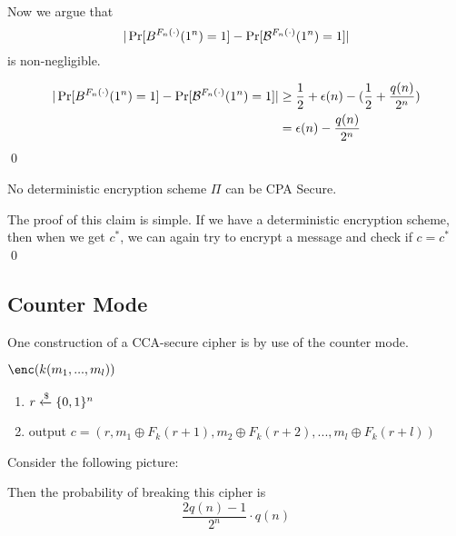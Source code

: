 Now we argue that 
$$|\Pr[B^{F_n(\cdot)}(1^n) = 1] - \Pr[\mathcal{B}^{F_n(\cdot)}(1^n) = 1]|$$
is non-negligible.

\begin{align*}
    |\Pr[B^{F_n(\cdot)}(1^n) = 1] - \Pr[\mathcal{B}^{F_n(\cdot)}(1^n) = 1]| &\ge \frac{1}{2} + \epsilon(n) - (\frac{1}{2} + \frac{q(n)}{2^n}) \\
    &= \epsilon(n) - \frac{q(n)}{2^n}
\end{align*}
\qed

\begin{theorem}
    No deterministic encryption scheme $\Pi$ can be CPA Secure.
\end{theorem}

\proof
The proof of this claim is simple.
If we have a deterministic encryption scheme, then when we get $c^*$, we can again try to encrypt a message and check if $c = c^*$
\qed


\subsection{Counter Mode}
One construction of a CCA-secure cipher is by use of the counter mode.

$\enc(k(m_1,...,m_l))$
\begin{enumerate}
    \item $r \xleftarrow{\$} \{0,1\}^n$
    \item output $c = (r, m_1 \oplus F_k(r+1),
            m_2 \oplus F_k(r+2),
            ...,
            m_l \oplus F_k(r+l))$
\end{enumerate}

Consider the following picture:

\begin{center}
\end{center}

Then the probability of breaking this cipher is
$$\frac{2q(n) - 1}{2^n} \cdot q(n)$$

